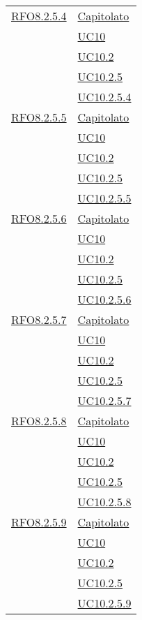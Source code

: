 \begin{longtable}{|>{\centering}m{5cm}|m{5cm}<{\centering}|}
 \hyperlink{RFO8.2.5.4}{RFO8.2.5.4} & \hyperlink{Capitolato}{Capitolato}\\
 & \hyperref[UC10]{UC10}\\
 & \hyperref[UC10.2]{UC10.2}\\
 & \hyperref[UC10.2.5]{UC10.2.5}\\
 & \hyperref[UC10.2.5.4]{UC10.2.5.4}\\\hline
 
 \hyperlink{RFO8.2.5.5}{RFO8.2.5.5} & \hyperlink{Capitolato}{Capitolato}\\
 & \hyperref[UC10]{UC10}\\
 & \hyperref[UC10.2]{UC10.2}\\
 & \hyperref[UC10.2.5]{UC10.2.5}\\
 & \hyperref[UC10.2.5.5]{UC10.2.5.5}\\\hline
 
 \hyperlink{RFO8.2.5.6}{RFO8.2.5.6} & \hyperlink{Capitolato}{Capitolato}\\
 & \hyperref[UC10]{UC10}\\
 & \hyperref[UC10.2]{UC10.2}\\
 & \hyperref[UC10.2.5]{UC10.2.5}\\
 & \hyperref[UC10.2.5.6]{UC10.2.5.6}\\\hline
 
 \hyperlink{RFO8.2.5.7}{RFO8.2.5.7} & \hyperlink{Capitolato}{Capitolato}\\
 & \hyperref[UC10]{UC10}\\
 & \hyperref[UC10.2]{UC10.2}\\
 & \hyperref[UC10.2.5]{UC10.2.5}\\
 & \hyperref[UC10.2.5.7]{UC10.2.5.7}\\\hline
 
 \hyperlink{RFO8.2.5.8}{RFO8.2.5.8} & \hyperlink{Capitolato}{Capitolato}\\
 & \hyperref[UC10]{UC10}\\
 & \hyperref[UC10.2]{UC10.2}\\
 & \hyperref[UC10.2.5]{UC10.2.5}\\
 & \hyperref[UC10.2.5.8]{UC10.2.5.8}\\\hline
 
 \hyperlink{RFO8.2.5.9}{RFO8.2.5.9} & \hyperlink{Capitolato}{Capitolato}\\
 & \hyperref[UC10]{UC10}\\
 & \hyperref[UC10.2]{UC10.2}\\
 & \hyperref[UC10.2.5]{UC10.2.5}\\
 & \hyperref[UC10.2.5.9]{UC10.2.5.9}\\\hline
 

\end{longtable}
